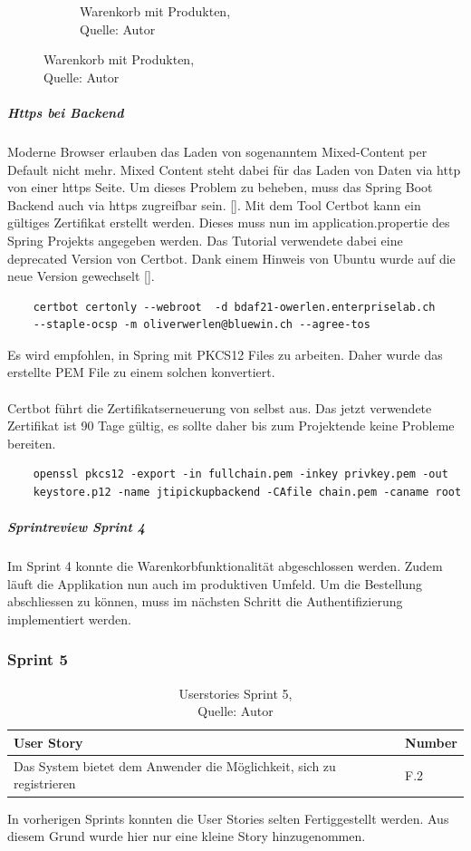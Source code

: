 \begin{figure}[h]
\begin{subfigure}[b]{0.4\textwidth}
		\caption[Warenkorb mit Produkten]{Warenkorb mit Produkten,\\ Quelle: Autor}
		\label{img: cartFull}
	\end{subfigure}
\end{figure} 

\subparagraph{Https bei Backend}\label{httpsBackend}
Moderne Browser erlauben das Laden von sogenanntem Mixed-Content per Default nicht mehr. Mixed Content steht dabei für das Laden von Daten via http von einer https Seite. Um dieses Problem zu beheben, muss das Spring Boot Backend auch via https zugreifbar sein.  [\cite{mixedContent}]. Mit dem Tool Certbot kann ein gültiges Zertifikat erstellt werden. Dieses muss nun im application.propertie des Spring Projekts angegeben werden. Das Tutorial verwendete dabei eine deprecated Version von Certbot. Dank einem Hinweis von Ubuntu wurde auf die neue Version gewechselt [\cite{springSSL}]. 

\begin{verbatim}
	certbot certonly --webroot  -d bdaf21-owerlen.enterpriselab.ch 
	--staple-ocsp -m oliverwerlen@bluewin.ch --agree-tos
\end{verbatim}

Es wird empfohlen, in Spring mit PKCS12 Files zu arbeiten. Daher wurde das erstellte PEM File zu einem solchen konvertiert. \\\\
Certbot führt die Zertifikatserneuerung von selbst aus. Das jetzt verwendete Zertifikat ist 90 Tage gültig, es sollte daher bis zum Projektende keine Probleme bereiten. \\

\begin{verbatim}
	openssl pkcs12 -export -in fullchain.pem -inkey privkey.pem -out 
	keystore.p12 -name jtipickupbackend -CAfile chain.pem -caname root
\end{verbatim}

\subparagraph{Sprintreview Sprint 4}
Im Sprint 4 konnte die Warenkorbfunktionalität abgeschlossen werden. Zudem läuft die Applikation nun auch im produktiven Umfeld.
Um die Bestellung abschliessen zu können, muss im nächsten Schritt die Authentifizierung implementiert werden.  

\subsubsection{Sprint 5}
\begin{table}[H]
	\begin{tabularx}{\textwidth}{|l|X|}
		\hline
		\textbf{User Story} & \textbf{Number} \\
		\hline
		Das System bietet dem Anwender die Möglichkeit, sich zu registrieren& F.2\\
		\hline
	\end{tabularx} 
	\caption[Userstories Sprint 5]{Userstories Sprint 5,\\ Quelle: Autor}
\end{table}\label{userStoriesSprint5}
 In vorherigen Sprints konnten die User Stories selten Fertiggestellt werden. Aus diesem Grund wurde hier nur eine kleine Story hinzugenommen.
 
